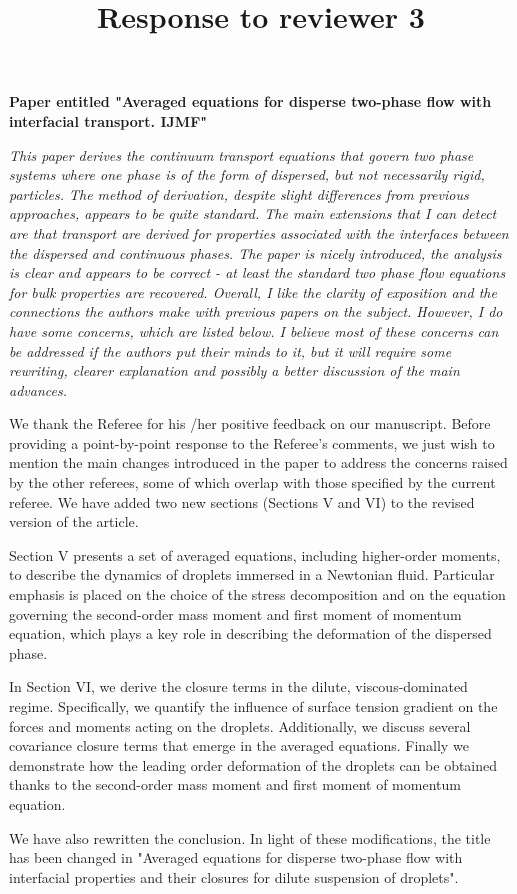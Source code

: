\documentclass[10pt,a4paper]{article}
\newcommand{\tb}[1]{\color{blue}#1\color{black}}
\begin{document}
\title{Response to reviewer 3} 
\maketitle
\textbf{Paper entitled "Averaged equations for disperse two-phase flow with interfacial transport. IJMF"}
\bigskip




\textit{This paper derives the continuum transport equations that govern two phase systems where
one phase is of the form of dispersed, but not necessarily rigid, particles. The method of
derivation, despite slight differences from previous approaches, appears to be quite standard.
The main extensions that I can detect are that transport are derived for properties associated
with the interfaces between the dispersed and continuous phases. The paper is nicely
introduced, the analysis is clear and appears to be correct - at least the standard two phase
flow equations for bulk properties are recovered. Overall, I like the clarity of exposition and
the connections the authors make with previous papers on the subject.
However, I do have some concerns, which are listed below. I believe most of these concerns
can be addressed if the authors put their minds to it, but it will require some rewriting, clearer
explanation and possibly a better discussion of the main advances.}

\tb{We thank the Referee for his /her positive feedback on our manuscript.
Before providing a point-by-point response to the Referee’s comments, we just wish to mention the main changes introduced in the paper to address the concerns raised by the other referees, some of which overlap with
those specified by the current referee.
We have added two new sections (Sections V and VI) to the revised version of the article.

Section V presents a set of averaged equations, including higher-order moments, to describe the dynamics of droplets immersed in a Newtonian fluid. 
Particular emphasis is placed on the choice of the stress decomposition and on the equation governing the second-order mass moment and first moment of momentum equation, which plays a key role in describing the deformation of the dispersed phase.

In Section VI, we derive the closure terms in the dilute, viscous-dominated regime. 
Specifically, we quantify the influence of surface tension gradient on the forces and moments acting on the droplets. 
Additionally, we discuss several covariance closure terms that emerge in the averaged equations.
Finally we demonstrate how the leading order deformation of the droplets can be obtained thanks to the second-order mass moment and first moment of momentum equation.

We have also rewritten the conclusion.
In light of these modifications, the title has been changed in "Averaged equations for disperse two-phase flow with interfacial properties and their closures for dilute suspension of droplets".


}
\end{document}
